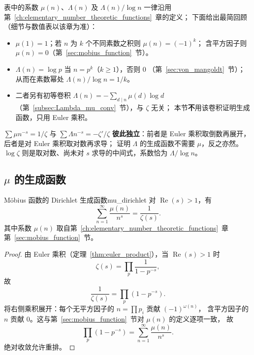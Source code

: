 \vspace{0.4em}
\noindent
表中的系数 $\mu(n)$、$\Lambda(n)$ 及 $\Lambda(n)/\log n$
一律沿用第~\ref{ch:elementary_number_theoretic_functions}~章的定义；
下面给出最简回顾（细节与数值表以该章为准）：
\begin{itemize}
  \item $\mu(1)=1$；若 $n$ 为 $k$ 个不同素数之积则 $\mu(n)=(-1)^k$；
        含平方因子则 $\mu(n)=0$（第~\ref{sec:mobius_function}~节）。
  \item $\Lambda(n)=\log p$ 当 $n=p^k$（$k\ge 1$），否则 $0$
        （第~\ref{sec:von_mangoldt}~节）；
        从而在素数幂处 $\Lambda(n)/\log n=1/k$。
  \item 二者另有初等卷积 $\Lambda(n)=-\sum_{d\mid n}\mu(d)\log d$
        （第~\ref{subsec:Lambda_mu_conv}~节），与 $\zeta$ 无关；
        本节\textbf{不}用该卷积证明生成函数，只用 Euler 乘积。
\end{itemize}

$\sum\mu n^{-s}=1/\zeta$ 与 $\sum\Lambda n^{-s}=-\zeta'/\zeta$
\textbf{彼此独立}：前者是 Euler 乘积取倒数再展开，后者是对 Euler 乘积取对数再求导；
证明 $\Lambda$ 的生成函数不需要 $\mu$，反之亦然。
$\log\zeta$ 则是取对数、尚未对 $s$ 求导的中间式，系数恰为 $\Lambda/\log n$。

\subsection{\texorpdfstring{$\mu$}{mu} 的生成函数}

\begin{theorem}{Möbius 函数的 Dirichlet 生成函数}{mu_dirichlet}
对 $\operatorname{Re}(s) > 1$，有
\begin{equation}
\sum_{n=1}^{\infty} \frac{\mu(n)}{n^{s}} = \frac{1}{\zeta(s)}.
\label{eq:mu_dirichlet}
\end{equation}
其中系数 $\mu(n)$ 取自第~\ref{ch:elementary_number_theoretic_functions}~章第~\ref{sec:mobius_function}~节。
\end{theorem}

\begin{proof}
由 Euler 乘积（定理~\ref{thm:euler_product}），当 $\operatorname{Re}(s)>1$ 时
\[
\zeta(s) = \prod_{p} \frac{1}{1-p^{-s}},
\]
故
\[
\frac{1}{\zeta(s)} = \prod_{p} (1-p^{-s}).
\]
将右侧乘积展开：每个无平方因子的 $n=\prod p_i$ 贡献 $(-1)^{\omega(n)}$，
含平方因子的 $n$ 贡献 $0$。这与第~\ref{sec:mobius_function}~节对 $\mu(n)$ 的定义逐项一致，
故
\[
\prod_{p} (1-p^{-s}) = \sum_{n=1}^{\infty} \frac{\mu(n)}{n^{s}}.
\]
绝对收敛允许重排。
\end{proof}

